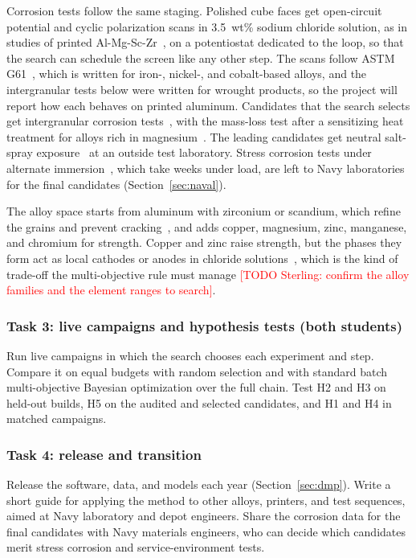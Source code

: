 \documentclass[12pt,letterpaper]{article}
\newcommand{\todo}[1]{\textcolor{red}{[TODO Sterling: #1]}}
\begin{document}
Corrosion tests follow the same staging. Polished cube faces get
open-circuit potential and cyclic polarization scans in 3.5~wt\% sodium
chloride solution, as in studies of printed Al-Mg-Sc-Zr~\cite{cabreracorrea2023},
on a potentiostat dedicated to the loop, so that the search can schedule the
screen like any other step. The scans follow ASTM G61~\cite{astmG61}, which
is written for iron-, nickel-, and cobalt-based alloys, and the intergranular
tests below were written for wrought products, so the project will report
how each behaves on printed aluminum. Candidates that
the search selects get intergranular corrosion tests~\cite{astmG110}, with the
mass-loss test after a sensitizing heat treatment for alloys rich in
magnesium~\cite{astmG67}. The leading candidates get neutral salt-spray
exposure~\cite{astmB117} at an outside test laboratory. Stress corrosion tests
under alternate immersion~\cite{astmG44}, which take weeks under load, are
left to Navy laboratories for the final candidates
(Section~\ref{sec:naval}).

The alloy space starts from aluminum with zirconium or scandium, which
refine the grains and prevent cracking~\cite{martin2017,thapliyal2020}, and
adds copper, magnesium, zinc, manganese, and chromium for strength. Copper
and zinc raise strength, but the phases they form act as local cathodes or
anodes in chloride solutions~\cite{birbilis2005}, which is the kind of
trade-off the multi-objective rule must manage \todo{confirm the alloy
families and the element ranges to search}.

\subsubsection{Task 3: live campaigns and hypothesis tests (both students)}
Run live campaigns in which the search chooses each experiment and step.
Compare it on equal budgets with random selection and with standard batch
multi-objective Bayesian optimization over the full chain. Test H2 and H3 on
held-out builds, H5 on the audited and selected candidates, and H1 and H4 in
matched campaigns.

\subsubsection{Task 4: release and transition}
Release the software, data, and models each year (Section~\ref{sec:dmp}).
Write a short guide for applying the method to other alloys, printers, and
test sequences, aimed at Navy laboratory and depot engineers. Share the
corrosion data for the final candidates with Navy materials engineers, who
can decide which candidates merit stress corrosion and service-environment
tests.
\end{document}
